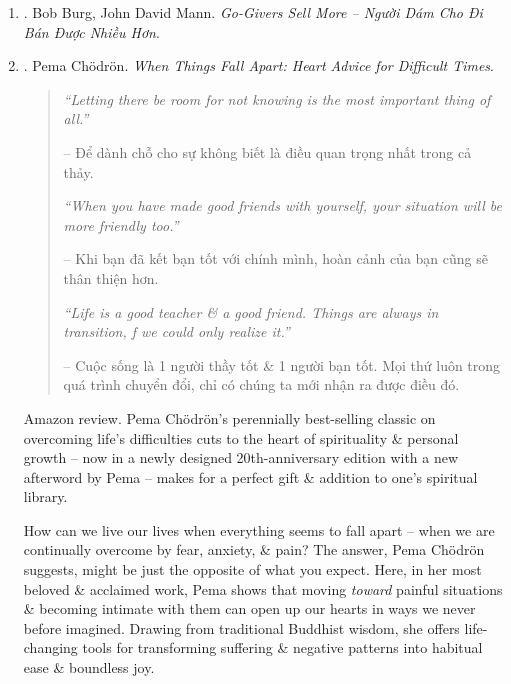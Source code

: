 \documentclass{article}
\begin{document}
\begin{enumerate}
	\item \cite{Burg_Mann_giver_VN}. {\sc Bob Burg, John David Mann}. {\it Go-Givers Sell More -- Người Dám Cho Đi Bán Được Nhiều Hơn}.\hfill{\sf[done]}

	\item \cite{Chodron_fall_apart}. {\sc Pema Ch\"odr\"on}. {\it When Things Fall Apart: Heart Advice for Difficult Times}.\hfill{\sf[reading]}
	\begin{quotation}
		{\it``Letting there be room for not knowing is the most important thing of all.''}

		-- Để dành chỗ cho sự không biết là điều quan trọng nhất trong cả thảy.

		{\it``When you have made good friends with yourself, your situation will be more friendly too.''}

		-- Khi bạn đã kết bạn tốt với chính mình, hoàn cảnh của bạn cũng sẽ thân thiện hơn.

		{\it``Life is a good teacher \& a good friend. Things are always in transition, f we could only realize it.''}

		-- Cuộc sống là 1 người thầy tốt \& 1 người bạn tốt. Mọi thứ luôn trong quá trình chuyển đổi, chỉ có chúng ta mới nhận ra được điều đó.
	\end{quotation}
	{\sf Amazon review.} {\sc Pema Ch\"odr\"on}'s perennially best-selling classic on overcoming life's difficulties cuts to the heart of spirituality \& personal growth -- now in a newly designed 20th-anniversary edition with a new afterword by {\sc Pema} -- makes for a perfect gift \& addition to one's spiritual library.

	How can we live our lives when everything seems to fall apart -- when we are continually overcome by fear, anxiety, \& pain? The answer, {\sc Pema Ch\"odr\"on} suggests, might be just the opposite of what you expect. Here, in her most beloved \& acclaimed work, {\sc Pema} shows that moving {\it toward} painful situations \& becoming intimate with them can open up our hearts in ways we never before imagined. Drawing from traditional Buddhist wisdom, she offers life-changing tools for transforming suffering \& negative patterns into habitual ease \& boundless joy.


\end{enumerate}
\end{document}
